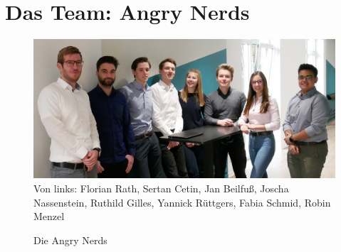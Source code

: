 \section{Das Team: Angry Nerds}
\label{instal}

\begin{figure}[H]
\centering
\begin{minipage}[t]{1\textwidth} %
\caption{Die Angry Nerds} %
\includegraphics[width=1\textwidth]{img/AngryNerds}\\ %
Von links: Florian Rath, Sertan Cetin, Jan Beilfuß, Joscha Nassenstein, Ruthild Gilles, Yannick Rüttgers, Fabia Schmid, Robin Menzel
\end{minipage}
\end{figure}

